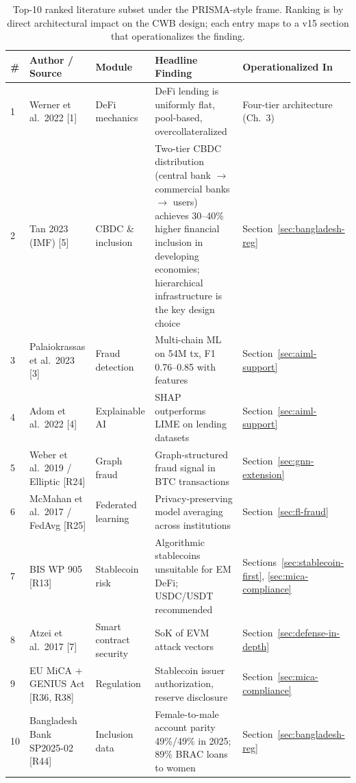 \documentclass[12pt,a4paper]{report}
\begin{document}
\begin{table}[H]
\centering
\caption{Top-10 ranked literature subset under the PRISMA-style frame. Ranking is by direct architectural impact on the CWB design; each entry maps to a v15 section that operationalizes the finding.}
\label{tab:lit-top10}
\small
\renewcommand{\arraystretch}{1.15}
\begin{tabular}{p{0.4cm}p{3.4cm}p{3.0cm}p{3.0cm}p{3.4cm}}
\hline
\textbf{\#} & \textbf{Author / Source} & \textbf{Module} & \textbf{Headline Finding} & \textbf{Operationalized In} \\
\hline
1 & Werner et al.\ 2022 [1] & DeFi mechanics & DeFi lending is uniformly flat, pool-based, overcollateralized & Four-tier architecture (Ch.~3) \\
\hline
2 & Tan 2023 (IMF) [5] & CBDC \& inclusion & Two-tier CBDC distribution (central bank $\to$ commercial banks $\to$ users) achieves 30--40\% higher financial inclusion in developing economies; hierarchical infrastructure is the key design choice & Section~\ref{sec:bangladesh-reg} \\
\hline
3 & Palaiokrassas et al.\ 2023 [3] & Fraud detection & Multi-chain ML on 54M tx, F1 0.76--0.85 with features & Section~\ref{sec:aiml-support} \\
\hline
4 & Adom et al.\ 2022 [4] & Explainable AI & SHAP outperforms LIME on lending datasets & Section~\ref{sec:aiml-support} \\
\hline
5 & Weber et al.\ 2019 / Elliptic [R24] & Graph fraud & Graph-structured fraud signal in BTC transactions & Section~\ref{sec:gnn-extension} \\
\hline
6 & McMahan et al.\ 2017 / FedAvg [R25] & Federated learning & Privacy-preserving model averaging across institutions & Section~\ref{sec:fl-fraud} \\
\hline
7 & BIS WP 905 [R13] & Stablecoin risk & Algorithmic stablecoins unsuitable for EM DeFi; USDC/USDT recommended & Sections~\ref{sec:stablecoin-first}, \ref{sec:mica-compliance} \\
\hline
8 & Atzei et al.\ 2017 [7] & Smart contract security & SoK of EVM attack vectors & Section~\ref{sec:defense-in-depth} \\
\hline
9 & EU MiCA + GENIUS Act [R36, R38] & Regulation & Stablecoin issuer authorization, reserve disclosure & Section~\ref{sec:mica-compliance} \\
\hline
10 & Bangladesh Bank SP2025-02 [R44] & Inclusion data & Female-to-male account parity 49\%/49\% in 2025; 89\% BRAC loans to women & Section~\ref{sec:bangladesh-reg} \\
\hline
\end{tabular}
\end{table}
\end{document}
